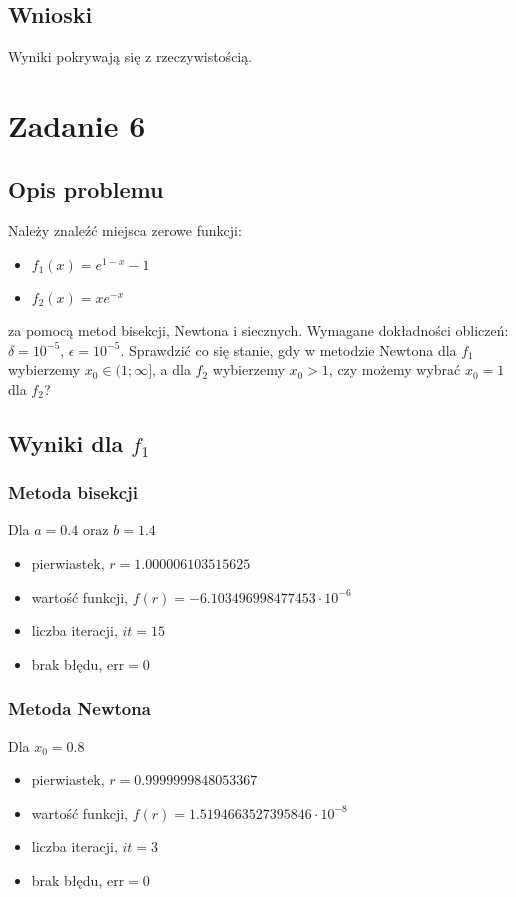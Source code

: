 \documentclass{article}
\begin{document}
\subsection*{Wnioski}
	Wyniki pokrywają się z rzeczywistością.

\clearpage

\section*{Zadanie 6}
\subsection*{Opis problemu}
	Należy znaleźć miejsca zerowe funkcji:
	\begin{itemize}
		\item $f_1(x) = e^{1-x} - 1$ 
		\item $f_2(x) = xe^{-x}$
	\end{itemize}
	za pomocą metod bisekcji, Newtona i siecznych. Wymagane dokładności obliczeń: $\delta = 10^{-5}$, $\epsilon = 10^{-5}$. Sprawdzić co się stanie, gdy w metodzie Newtona dla $f_1$ wybierzemy $x_0 \in (1; \infty]$, a dla $f_2$ wybierzemy $x_0 > 1$, czy możemy wybrać $x_0 = 1$ dla $f_2$?
\subsection*{Wyniki dla $f_1$}
\subsubsection*{Metoda bisekcji}
	Dla $a = 0.4$ oraz $b = 1.4$
	\begin{itemize}
		\item pierwiastek, $r = 1.000006103515625$
	    \item wartość funkcji, $f(r) = -6.103496998477453 \cdot 10^{-6}$
	    \item liczba iteracji, $it = 15$
	    \item brak błędu, $\mathrm{err} = 0$
	\end{itemize}
\subsubsection*{Metoda Newtona}
	Dla $x_0 = 0.8$
	\begin{itemize}
		\item pierwiastek, $r = 0.9999999848053367$
	    \item wartość funkcji, $f(r) = 1.5194663527395846 \cdot 10^{-8}$
	    \item liczba iteracji, $it = 3$
	    \item brak błędu, $\mathrm{err} = 0$
	\end{itemize}
\end{document}
